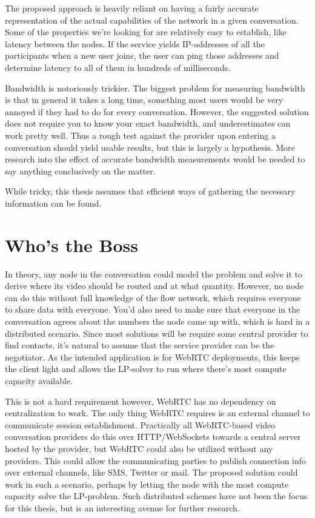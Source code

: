 The proposed approach is heavily reliant on having a fairly accurate representation of the actual capabilities of the network in a given conversation. Some of the properties we're looking for are relatively easy to establish, like latency between the nodes. If the service yields IP-addresses of all the participants when a new user joins, the user can ping those addresses and determine latency to all of them in hundreds of milliseconds.

Bandwidth is notoriously trickier. The biggest problem for measuring bandwidth is that in general it takes a long time, something most users would be very annoyed if they had to do for every conversation. However, the suggested solution does not require you to know your exact bandwidth, and underestimates can work pretty well. Thus a rough test against the provider upon entering a conversation should yield usable results, but this is largely a hypothesis. More research into the effect of accurate bandwidth measurements would be needed to say anything conclusively on the matter.

While tricky, this thesis assumes that efficient ways of gathering the necessary information can be found.


\section{Who's the Boss}

In theory, any node in the conversation could model the problem and solve it to derive where its video should be routed and at what quantity. However, no node can do this without full knowledge of the flow network, which requires everyone to share data with everyone. You'd also need to make sure that everyone in the conversation agrees about the numbers the node came up with, which is hard in a distributed scenario. Since most solutions will be require some central provider to find contacts, it's natural to assume that the service provider can be the negotiator. As the intended application is for WebRTC deployments, this keeps the client light and allows the LP-solver to run where there's most compute capacity available.

This is not a hard requirement however, WebRTC has no dependency on centralization to work. The only thing WebRTC requires is an external channel to communicate session establishment. Practically all WebRTC-based video conversation providers do this over HTTP/WebSockets towards a central server hosted by the provider, but WebRTC could also be utilized without any providers. This could allow the communicating parties to publish connection info over external channels, like SMS, Twitter or mail. The proposed solution could work in such a scenario, perhaps by letting the node with the most compute capacity solve the LP-problem. Such distributed schemes have not been the focus for this thesis, but is an interesting avenue for further research.


